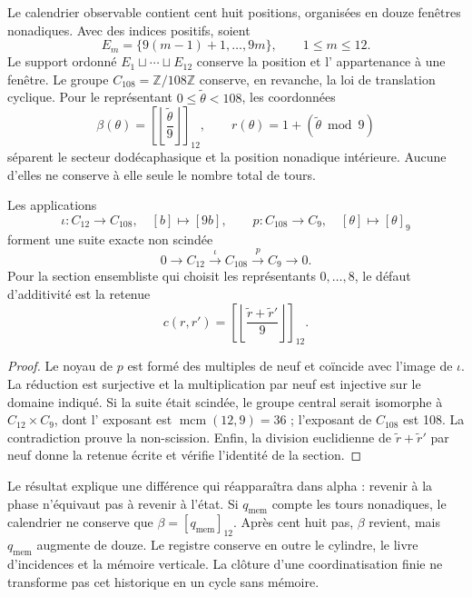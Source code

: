 Le calendrier observable contient cent huit positions, organisées en douze fenêtres nonadiques. Avec des indices positifs, soient
\[
 E_m=\{9(m-1)+1,\ldots,9m\},\qquad 1\leq m\leq12.
\]
Le support ordonné \(E_1\sqcup\cdots\sqcup E_{12}\) conserve la position et l'
appartenance à une fenêtre. Le groupe \(C_{108}=\mathbb Z/108\mathbb Z\)
conserve, en revanche, la loi de translation cyclique. Pour le représentant
\(0\leq\widetilde\theta<108\), les coordonnées
\[
 \beta(\theta)=\left[\left\lfloor\frac{\widetilde\theta}{9}\right\rfloor\right]_{12},
 \qquad r(\theta)=1+(\widetilde\theta\bmod9)
\]
séparent le secteur dodécaphasique et la position nonadique intérieure. Aucune d'elles ne conserve à elle seule le nombre total de tours.

\begin{proposition}
\label{prop:k-extension}
Les applications
\[
 \iota:C_{12}\longrightarrow C_{108},\quad[b]\longmapsto[9b],
 \qquad p:C_{108}\longrightarrow C_9,\quad[\theta]\longmapsto[\theta]_9
\]
forment une suite exacte non scindée
\[
 0\longrightarrow C_{12}\xrightarrow{\iota}C_{108}
 \xrightarrow{p}C_9\longrightarrow0.
\]
Pour la section ensembliste qui choisit les représentants \(0,\ldots,8\), le défaut d'additivité est la retenue
\[
 c(r,r')=\left[\left\lfloor\frac{\widetilde r+\widetilde r'}9\right\rfloor\right]_{12}.
\]
\end{proposition}

\begin{proof}
Le noyau de \(p\) est formé des multiples de neuf et coïncide avec
l'image de \(\iota\). La réduction est surjective et la multiplication
par neuf est injective sur le domaine indiqué. Si la suite était
scindée, le groupe central serait isomorphe à \(C_{12}\times C_9\), dont l'
exposant est \(\operatorname{mcm}(12,9)=36\) ; l'exposant de
\(C_{108}\) est 108. La contradiction prouve la non-scission. Enfin,
la division euclidienne de \(\widetilde r+\widetilde r'\) par neuf donne la
retenue écrite et vérifie l'identité de la section.
\end{proof}

Le résultat explique une différence qui réapparaîtra dans alpha : revenir à la
phase n'équivaut pas à revenir à l'état. Si \(q_{\mathrm{mem}}\) compte les
tours nonadiques, le calendrier ne conserve que
\(\beta=[q_{\mathrm{mem}}]_{12}\). Après cent huit pas,
\(\beta\) revient, mais \(q_{\mathrm{mem}}\) augmente de douze. Le
registre conserve en outre le cylindre, le livre d'incidences et la mémoire
verticale. La clôture d'une coordinatisation finie ne transforme pas cet historique en un
cycle sans mémoire.

